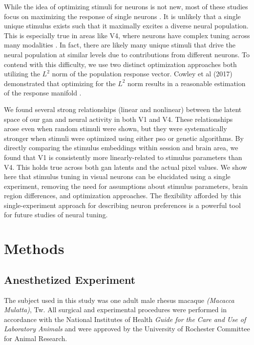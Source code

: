 While the idea of optimizing stimuli for neurons is not new, most of these studies focus on maximizing the response of single neurons \parencite{Ponce2019, Bashivan2019}.  It is unlikely that a single unique stimulus exists such that it maximally excites a diverse neural population. This is especially true in areas like V4, where neurons have complex tuning across many modalities \parencite{Pasupathy2002}. In fact, there are likely many unique stimuli that drive the neural population at similar levels due to contributions from different neurons. To contend with this difficulty, we use two distinct optimization approaches both utilizing the $L^2$ norm of the population response vector. Cowley et al (2017) demonstrated that optimizing for the $L^2$ norm results in a reasonable estimation of the response manifold \parencite{Cowley2017}.

We found several strong relationships (linear and nonlinear) between the latent space of our \gls{gan} and neural activity in both V1 and V4. These relationships arose even when random stimuli were shown, but they were systematically stronger when stimuli were optimized using either \gls{pso} or genetic algorithms. By directly comparing the stimulus embeddings within session and brain area, we found that V1 is consistently more linearly-related to stimulus parameters than V4. This holds true across both \gls{gan} latents and the actual pixel values. We show here that stimulus tuning in visual neurons can be elucidated using a single experiment, removing the need for assumptions about stimulus parameters, brain region differences, and optimization approaches. The flexibility afforded by this single-experiment approach for describing neuron preferences is a powerful tool for future studies of neural tuning.


\section{Methods}

\subsection*{Anesthetized Experiment}
The subject used in this study was one adult male rhesus macaque \textit{(Macacca Mulatta)}, Tw. All surgical and experimental procedures were performed in accordance with the National Institutes of Health \textit{Guide for the Care and Use of Laboratory Animals} and were approved by the University of Rochester Committee for Animal Research.

